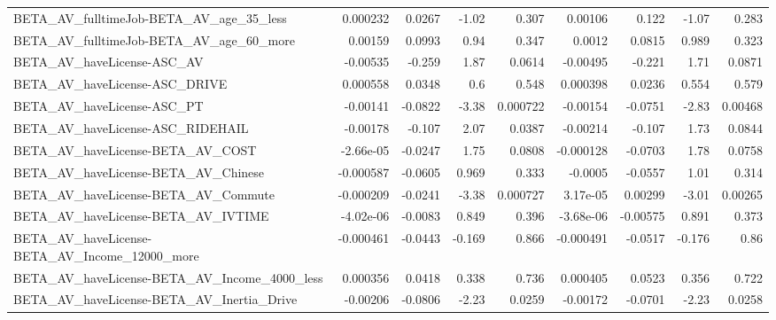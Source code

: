 \begin{tabular}{lrrrrrrrr}
BETA\_AV\_fulltimeJob-BETA\_AV\_age\_35\_less            &    0.000232 &       0.0267 &    -1.02 &    0.307 &    0.00106 &       0.122 &        -1.07 &         0.283 \\
BETA\_AV\_fulltimeJob-BETA\_AV\_age\_60\_more            &     0.00159 &       0.0993 &     0.94 &    0.347 &     0.0012 &      0.0815 &        0.989 &         0.323 \\
BETA\_AV\_haveLicense-ASC\_AV                         &    -0.00535 &       -0.259 &     1.87 &   0.0614 &   -0.00495 &      -0.221 &         1.71 &        0.0871 \\
BETA\_AV\_haveLicense-ASC\_DRIVE                      &    0.000558 &       0.0348 &      0.6 &    0.548 &   0.000398 &      0.0236 &        0.554 &         0.579 \\
BETA\_AV\_haveLicense-ASC\_PT                         &    -0.00141 &      -0.0822 &    -3.38 & 0.000722 &   -0.00154 &     -0.0751 &        -2.83 &       0.00468 \\
BETA\_AV\_haveLicense-ASC\_RIDEHAIL                   &    -0.00178 &       -0.107 &     2.07 &   0.0387 &   -0.00214 &      -0.107 &         1.73 &        0.0844 \\
BETA\_AV\_haveLicense-BETA\_AV\_COST                   &   -2.66e-05 &      -0.0247 &     1.75 &   0.0808 &  -0.000128 &     -0.0703 &         1.78 &        0.0758 \\
BETA\_AV\_haveLicense-BETA\_AV\_Chinese                &   -0.000587 &      -0.0605 &    0.969 &    0.333 &    -0.0005 &     -0.0557 &         1.01 &         0.314 \\
BETA\_AV\_haveLicense-BETA\_AV\_Commute                &   -0.000209 &      -0.0241 &    -3.38 & 0.000727 &   3.17e-05 &     0.00299 &        -3.01 &       0.00265 \\
BETA\_AV\_haveLicense-BETA\_AV\_IVTIME                 &   -4.02e-06 &      -0.0083 &    0.849 &    0.396 &  -3.68e-06 &    -0.00575 &        0.891 &         0.373 \\
BETA\_AV\_haveLicense-BETA\_AV\_Income\_12000\_more      &   -0.000461 &      -0.0443 &   -0.169 &    0.866 &  -0.000491 &     -0.0517 &       -0.176 &          0.86 \\
BETA\_AV\_haveLicense-BETA\_AV\_Income\_4000\_less       &    0.000356 &       0.0418 &    0.338 &    0.736 &   0.000405 &      0.0523 &        0.356 &         0.722 \\
BETA\_AV\_haveLicense-BETA\_AV\_Inertia\_Drive          &    -0.00206 &      -0.0806 &    -2.23 &   0.0259 &   -0.00172 &     -0.0701 &        -2.23 &        0.0258 \\

\end{tabular}
